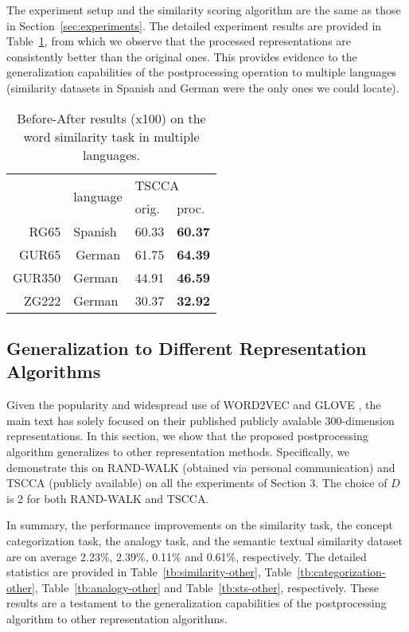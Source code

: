 \documentclass{article} \usepackage{acl2017,times}
\begin{document}
The experiment setup and the similarity scoring algorithm are the same as those in Section~\ref{sec:experiments}. The detailed experiment results are provided in Table~\ref{tb:similarity-multilingual}, from which we observe that the processed representations are consistently better than the original ones. This provides evidence to the generalization capabilities of the  postprocessing operation  to  multiple languages (similarity datasets in Spanish and German were the only ones we could locate).  

\begin{table}[!h]
\centering
\begin{tabular}{|r|l|l|l|}
\hline
\multirow{2}{*}{} & \multirow{2}{*}{language}   & \multicolumn{2}{l|}{TSCCA} \\ \cline{3-4} 
                  &                             & orig.        & proc.       \\ \hline
RG65              & Spanish                     & 60.33             &    \bf 60.37         \\ \hline
GUR65             & \multicolumn{1}{c|}{German} & 61.75             &    \bf 64.39         \\ \hline
GUR350            & German                      & 44.91             &    \bf 46.59         \\ \hline
ZG222             & German                      & 30.37             &    \bf 32.92         \\ \hline
\end{tabular}
\caption{Before-After results (x100) on the word similarity task in multiple languages.}
\label{tb:similarity-multilingual}
\end{table}

\subsection{Generalization to Different Representation Algorithms}
Given the popularity and widespread use of WORD2VEC \citep{mikolov2013efficient} and GLOVE \citep{pennington2014glove}, the main text has solely focused on their published publicly avalable 300-dimension representations. In this section, we show that the proposed postprocessing algorithm generalizes to other representation methods. Specifically, we demonstrate this on RAND-WALK (obtained via personal communication) and TSCCA (publicly available) on all the experiments of  Section 3. The choice of $D$ is 2 for both RAND-WALK and  TSCCA.

In summary, the performance improvements on the similarity task, the concept categorization task, the analogy task, and the semantic textual similarity dataset are on average 2.23\%, 2.39\%, 0.11\% and 0.61\%, respectively. The detailed statistics are provided in Table~\ref{tb:similarity-other}, Table~\ref{tb:categorization-other}, Table~\ref{tb:analogy-other} and Table~\ref{tb:sts-other}, respectively. These  results are a testament to the generalization capabilities of the postprocessing algorithm to other representation algorithms.  
\end{document}
